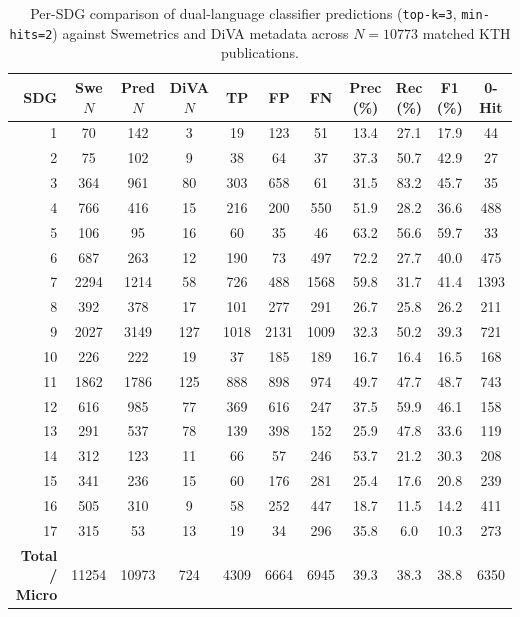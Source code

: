 \begin{table}[!ht]
  \centering
  \caption{Per-SDG comparison of dual-language classifier predictions (\texttt{top-k=3}, \texttt{min-hits=2}) against Swemetrics and \gls{DiVA} metadata across $N = \num{10773}$ matched \gls{KTH} publications.}
  \label{tab:swemetrics_per_sdg}
  \footnotesize
  \begin{tabular}{r S[table-format=5.0] S[table-format=5.0] S[table-format=3.0] *{3}{S[table-format=4.0]} *{3}{S[table-format=2.1]} S[table-format=4.0]}
    \toprule
    \textbf{SDG} & {\textbf{Swe $N$}} & {\textbf{Pred $N$}} & {\textbf{DiVA $N$}} & {\textbf{TP}} & {\textbf{FP}} & {\textbf{FN}} & {\textbf{Prec (\%)}} & {\textbf{Rec (\%)}} & {\textbf{F1 (\%)}} & {\textbf{0-Hit}} \\
     &   70 &  142 &   3 &   19 &  123 &   51 & 13.4 & 27.1 & 17.9 &   44 \\
     2 &   75 &  102 &   9 &   38 &   64 &   37 & 37.3 & 50.7 & 42.9 &   27 \\
     3 &  364 &  961 &  80 &  303 &  658 &   61 & 31.5 & 83.2 & 45.7 &   35 \\
     4 &  766 &  416 &  15 &  216 &  200 &  550 & 51.9 & 28.2 & 36.6 &  488 \\
     5 &  106 &   95 &  16 &   60 &   35 &   46 & 63.2 & 56.6 & 59.7 &   33 \\
     6 &  687 &  263 &  12 &  190 &   73 &  497 & 72.2 & 27.7 & 40.0 &  475 \\
     7 & 2294 & 1214 &  58 &  726 &  488 & 1568 & 59.8 & 31.7 & 41.4 & 1393 \\
     8 &  392 &  378 &  17 &  101 &  277 &  291 & 26.7 & 25.8 & 26.2 &  211 \\
     9 & 2027 & 3149 & 127 & 1018 & 2131 & 1009 & 32.3 & 50.2 & 39.3 &  721 \\
    10 &  226 &  222 &  19 &   37 &  185 &  189 & 16.7 & 16.4 & 16.5 &  168 \\
    11 & 1862 & 1786 & 125 &  888 &  898 &  974 & 49.7 & 47.7 & 48.7 &  743 \\
    12 &  616 &  985 &  77 &  369 &  616 &  247 & 37.5 & 59.9 & 46.1 &  158 \\
    13 &  291 &  537 &  78 &  139 &  398 &  152 & 25.9 & 47.8 & 33.6 &  119 \\
    14 &  312 &  123 &  11 &   66 &   57 &  246 & 53.7 & 21.2 & 30.3 &  208 \\
    15 &  341 &  236 &  15 &   60 &  176 &  281 & 25.4 & 17.6 & 20.8 &  239 \\
    16 &  505 &  310 &   9 &   58 &  252 &  447 & 18.7 & 11.5 & 14.2 &  411 \\
    17 &  315 &   53 &  13 &   19 &   34 &  296 & 35.8 &  6.0 & 10.3 &  273 \\
    \midrule
    \textbf{Total / Micro} & 11254 & 10973 & 724 & 4309 & 6664 & 6945 & 39.3 & 38.3 & 38.8 & 6350 \\
    \bottomrule
  \end{tabular}
\end{table}

